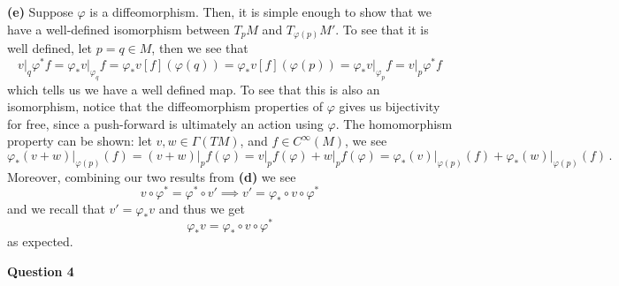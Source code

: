 \documentclass[10pt]{article}
\begin{document}
\textbf{(e)} Suppose $\varphi$ is a diffeomorphism. Then, it is simple enough to show that we have a well-defined isomorphism between $T_{p}M$ and $T_{\varphi(p)}M'$. To see that it is well defined, let $p =q \in M$, then we see that
\[ v\biggr\rvert_{q}\varphi^{*}f = \varphi_{*}v\biggr\rvert_{\varphi_{q}}f = \varphi_{*}v[f](\varphi(q)) = \varphi_{*}v[f](\varphi(p)) = \varphi_{*}v\biggr\rvert_{\varphi_{p}}f = v\biggr\rvert_{p}\varphi^{*}f \]
which tells us we have a well defined map. To see that this is also an isomorphism, notice that the diffeomorphism properties of $\varphi$ gives us bijectivity for free, since a push-forward is ultimately an action using $\varphi$. The homomorphism property can be shown: let $v,w \in \Gamma(TM)$, and $f\in C^{\infty}(M)$, we see
\[ \varphi_{*}(v + w)\biggr\rvert_{\varphi(p)}(f) = (v+w)\biggr\rvert_{p}f(\varphi)= v\biggr\rvert_{p}f(\varphi) + w\biggr\rvert_{p}f(\varphi) = \varphi_{*}(v)\biggr\rvert_{\varphi(p)}(f) + \varphi_{*}(w)\biggr\rvert_{\varphi(p)}(f) \, .\]
Moreover, combining our two results from \textbf{(d)} we see
\[ v\circ \varphi^{*} = \varphi^{*}\circ v' \implies v' = \varphi_{*}\circ v\circ \varphi^{*}\]
and we recall that $v' = \varphi_{*}v$ and thus we get
\[ \varphi_{*}v =  \varphi_{*}\circ v\circ \varphi^{*}\]
as expected.

\newpage
\textbf{Question 4}
\end{document}
